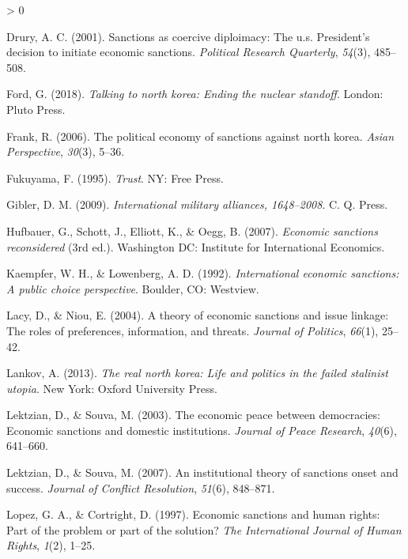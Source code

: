 \documentclass[
  english,
  man]{apa6}
\newlength{\cslhangindent}
\newenvironment{CSLReferences}[2] %
 {%
  \setlength{\parindent}{0pt}
  \ifodd #1 \everypar{\setlength{\hangindent}{\cslhangindent}}\ignorespaces\fi
  \ifnum #2 > 0
  \setlength{\parskip}{#2\baselineskip}
  \fi
 }%
 {}
\begin{document}
\begin{CSLReferences}{1}{0}
\leavevmode\hypertarget{ref-drury2001a}{}%
Drury, A. C. (2001). Sanctions as coercive diploimacy: The u.s. President's decision to initiate economic sanctions. \emph{Political Research Quarterly}, \emph{54}(3), 485--508.

\leavevmode\hypertarget{ref-ford2018a}{}%
Ford, G. (2018). \emph{Talking to north korea: Ending the nuclear standoff}. London: Pluto Press.

\leavevmode\hypertarget{ref-frank2006a}{}%
Frank, R. (2006). The political economy of sanctions against north korea. \emph{Asian Perspective}, \emph{30}(3), 5--36.

\leavevmode\hypertarget{ref-fukuyama1995a}{}%
Fukuyama, F. (1995). \emph{Trust}. NY: Free Press.

\leavevmode\hypertarget{ref-gibler2009a}{}%
Gibler, D. M. (2009). \emph{International military alliances, 1648--2008}. C. Q. Press.

\leavevmode\hypertarget{ref-hufbauer2007a}{}%
Hufbauer, G., Schott, J., Elliott, K., \& Oegg, B. (2007). \emph{Economic sanctions reconsidered} (3rd ed.). Washington DC: Institute for International Economics.

\leavevmode\hypertarget{ref-kaempfer1992a}{}%
Kaempfer, W. H., \& Lowenberg, A. D. (1992). \emph{International economic sanctions: A public choice perspective}. Boulder, CO: Westview.

\leavevmode\hypertarget{ref-lacy2004a}{}%
Lacy, D., \& Niou, E. (2004). A theory of economic sanctions and issue linkage: The roles of preferences, information, and threats. \emph{Journal of Politics}, \emph{66}(1), 25--42.

\leavevmode\hypertarget{ref-lankov2013a}{}%
Lankov, A. (2013). \emph{The real north korea: Life and politics in the failed stalinist utopia}. New York: Oxford University Press.

\leavevmode\hypertarget{ref-lektzian2003a}{}%
Lektzian, D., \& Souva, M. (2003). The economic peace between democracies: Economic sanctions and domestic institutions. \emph{Journal of Peace Research}, \emph{40}(6), 641--660.

\leavevmode\hypertarget{ref-lektzian2007a}{}%
Lektzian, D., \& Souva, M. (2007). An institutional theory of sanctions onset and success. \emph{Journal of Conflict Resolution}, \emph{51}(6), 848--871.

\leavevmode\hypertarget{ref-lopez1997a}{}%
Lopez, G. A., \& Cortright, D. (1997). Economic sanctions and human rights: Part of the problem or part of the solution? \emph{The International Journal of Human Rights}, \emph{1}(2), 1--25.


\end{CSLReferences}
\end{document}
